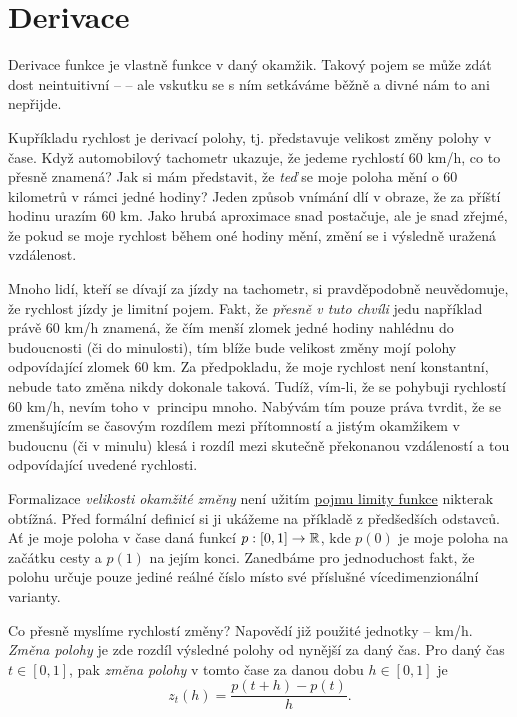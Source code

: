 \chapter{Derivace}
\label{chap:derivace}


Derivace funkce je vlastně  funkce v daný okamžik. Takový
pojem se může zdát dost neintuitivní --  -- ale vskutku se s ním setkáváme běžně a divné nám to ani nepřijde.

Kupříkladu rychlost je derivací polohy, tj. představuje velikost změny polohy v
čase. Když automobilový tachometr ukazuje, že jedeme rychlostí 60 km/h, co to
přesně znamená? Jak si mám představit, že \emph{teď} se moje poloha mění o 60
kilometrů v rámci jedné hodiny? Jeden způsob vnímání dlí v obraze, že za příští
hodinu urazím 60 km. Jako hrubá aproximace snad postačuje, ale je snad zřejmé,
že pokud se moje rychlost během oné hodiny mění, změní se i výsledně uražená
vzdálenost.

Mnoho lidí, kteří se dívají za jízdy na tachometr, si pravděpodobně neuvědomuje,
že rychlost jízdy je limitní pojem. Fakt, že \emph{přesně v tuto chvíli} jedu
například právě 60 km/h znamená, že čím menší zlomek jedné hodiny nahlédnu do
budoucnosti (či do minulosti), tím blíže bude velikost změny mojí polohy
odpovídající zlomek 60 km. Za předpokladu, že moje rychlost není konstantní,
nebude tato změna nikdy dokonale taková. Tudíž, vím-li, že se pohybuji rychlostí
60 km/h, nevím toho v~principu mnoho. Nabývám tím pouze práva tvrdit, že se
zmenšujícím se časovým rozdílem mezi přítomností a jistým okamžikem v budoucnu
(či v minulu) klesá i rozdíl mezi skutečně překonanou vzdáleností a tou
odpovídající uvedené rychlosti.

Formalizace \emph{velikosti okamžité změny} není užitím
\hyperref[def:oboustranna-limita-funkce]{pojmu limity funkce} nikterak obtížná.
Před formální definicí si ji ukážeme na příkladě z předšedších odstavců. Ať je
moje poloha v čase daná funkcí $p:[0,1] \to \mathbb{R}$, kde $p(0)$ je moje poloha na
začátku cesty a $p(1)$ na jejím konci. Zanedbáme pro jednoduchost fakt, že
polohu určuje pouze jediné reálné číslo místo své příslušné vícedimenzionální
varianty.

Co přesně myslíme rychlostí změny? Napovědí již použité jednotky -- km/h.
\emph{Změna polohy} je zde rozdíl výsledné polohy od nynější za daný čas. Pro
daný čas $t \in [0,1]$, pak \emph{změna polohy} v tomto čase za danou dobu $h
\in [0,1]$ je
\[
 z_t(h) = \frac{p(t + h) - p(t)}{h}.
\]

